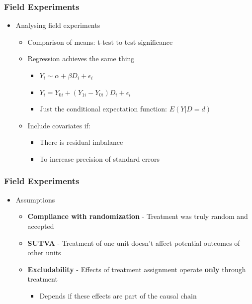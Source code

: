 \documentclass[xcolor=x11names,compress]{beamer}\usepackage[]{graphicx}\usepackage[]{color}
\renewcommand{\(}{\begin{columns}}
\renewcommand{\)}{\end{columns}}
\newcommand{\<}[1]{\begin{column}{#1}}
\renewcommand{\>}{\end{column}}
\begin{document}
\begin{frame}
\frametitle{Field Experiments}
\begin{itemize}
\item Analysing field experiments
\begin{itemize}
\item Comparison of means: t-test to test significance
\item Regression achieves the same thing
\begin{itemize}
\item $Y_i \sim \alpha + \beta D_i + \epsilon_i$ 
\item $Y_i= Y_{0i} + (Y_{1i} - Y_{0i}) D_i + \epsilon_i$
\item Just the conditional expectation function: $E(Y|D=d)$
\end{itemize}
\item Include covariates if:
\begin{itemize}
\item There is residual imbalance
\item To increase precision of standard errors
\end{itemize}
\end{itemize}
\end{itemize}
\end{frame}

\begin{frame}
\frametitle{Field Experiments}
\begin{itemize}
\item Assumptions
\begin{itemize}
\item \textbf{Compliance with randomization} - Treatment was truly random and accepted
\item \textbf{SUTVA} - Treatment of one unit doesn't affect potential outcomes of other units
\item \textbf{Excludability} - Effects of treatment assignment operate \textbf{only} through treatment
\begin{itemize}
\item Depends if these effects are part of the causal chain
\end{itemize}
\end{itemize}
\end{itemize}
\end{frame}
\end{document}
